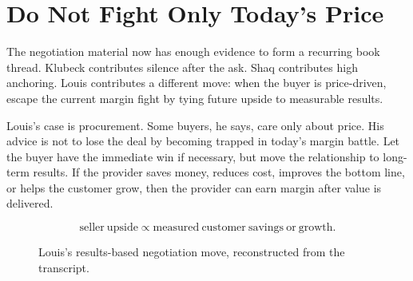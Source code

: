 \documentclass[11pt,oneside]{book}
\begin{document}
\section{Do Not Fight Only Today's Price}

The negotiation material now has enough evidence to form a recurring book thread. Klubeck contributes silence after the ask. Shaq contributes high anchoring. Louis contributes a different move: when the buyer is price-driven, escape the current margin fight by tying future upside to measurable results.

Louis's case is procurement. Some buyers, he says, care only about price. His advice is not to lose the deal by becoming trapped in today's margin battle. Let the buyer have the immediate win if necessary, but move the relationship to long-term results. If the provider saves money, reduces cost, improves the bottom line, or helps the customer grow, then the provider can earn margin after value is delivered.

\begin{equation}
\mathrm{seller\ upside}
\propto
\mathrm{measured\ customer\ savings\ or\ growth}.
\end{equation}

\begin{figure}
\centering
{}
\caption{Louis's results-based negotiation move, reconstructed from the transcript.}
\end{figure}
\end{document}
